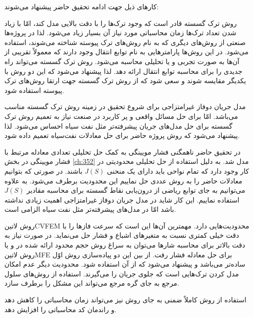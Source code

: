 کارهای ذیل جهت ادامه تحقیق حاضر پیشنهاد می‌شوند:
\begin{tight_itemize}
\item روش ترک گسسته قادر است که وجود ترک‌ها را با دقت بالایی مدل کند، امّا با زیاد شدن تعداد ترک‌ها زمان محاسباتی مورد نیاز آن بسیار زیاد می‌شود. لذا در پروژه‌ها صنعتی از روش‌های دیگری که به نام روش‌های ترک پیوسته شناخته می‌شوند، استفاده می‌شود. در این روش‌ها پارامترهایی به نام توابع انتقال وجود دارند که معمولاً تقریبی از آن‌ها به صورت تجربی و یا تحلیلی محاسبه می‌شود. روش ترک گسسته می‌تواند راه جدیدی را برای محاسبه توابع انتقال ارائه دهد. لذا پیشنهاد می‌شود که این دو روش با یکدیگر مقایسه شوند و سعی شود که از روش ترک گسسته جهت ارتقا روش‌های ترک پیوسته استفاده شود.
\item مدل جریان دوفاز غیرامتزاجی برای شروع تحقیق در زمینه روش ترک گسسته مناسب می‌باشد. امّا برای حل مسائل واقعی  و پر کاربرد در صنعت نیاز به تعمیم روش ترک گسسته برای حل مدل‌های جریان پیشرفته‌تر مثل نفت سیاه احساس می‌شود. لذا پیشنهاد می‌شود که روش پروژه حاضر برای حل معادلات نفت‌سیاه تعمیم داده شود.
\item در تحقیق حاضر ناهمگنی فشار مویینگی به کمک حل تحلیلی تعدادی معادله مرتبط با فشار مویینگی در بخش \ref{ch:352} مدل شد. به دلیل استفاده از حل تحلیلی محدودیتی در کار وجود دارد که تمام نواحی باید دارای یک منحنی $J(S)$ باشند. در صورتی که بتوانیم معادلات حاضر را به روش عددی حل نماییم این محدودیت برطرف می‌شود. به علاوه می‌توانیم به جای توابع ریاضی از درون‌یابی نقاط گسسته برای محاسبه مقادیر $J(S)$ استفاده نماییم. این کار شاید در مدل جریان دوفاز غیرامتزاجی اهمیت زیادی نداشته باشد امّا در مدل‌های پیشرفته‌تر مثل نفت سیاه الزامی است.
\item روش \text‌لاتین{CVFEM} محدودیت‌هایی دارد. مهمترین آن‌ها این است که سرعت فاز‌ها را با دقت خیلی کمتری نسبت به متغیر‌های اشباع و فشار حل می‌نماید. در صورت نیاز به دقت بالاتر برای محاسبه شار‌ها می‌توان به سراغ روش حجم محدود ارائه شده در \cite{edwards2} و یا روش  \text‌لاتین{MFE}\cite{hoteitf,hoteitn} برای حل معادله فشار رفت. از بین این دو پیاده‌سازی روش اوّل ساده‌تر می‌باشد و پیشنهاد می‌شود که از آن استفاده شود. محدودیت دیگر عدم امکان مدل کردن ترک‌هایی است که جلوی جریان را می‌گیرند. استفاده از روش‌های سلول مرجع به جای گره مرجع\cite{edwards2,karimi2} می‌تواند این مشکل را برطرف سازد.
\item استفاده از روش کاملاً ضمنی به جای روش  نیز می‌تواند زمان محاسباتی را کاهش دهد و راندمان کد محاسباتی را افزایش دهد.
\end{tight_itemize}
